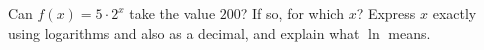 Can $f(x)=5\cdot2^x$ take the value $200$? If so, for which $x$? Express $x$ exactly using logarithms and also as a decimal, and explain what $\ln$ means.
